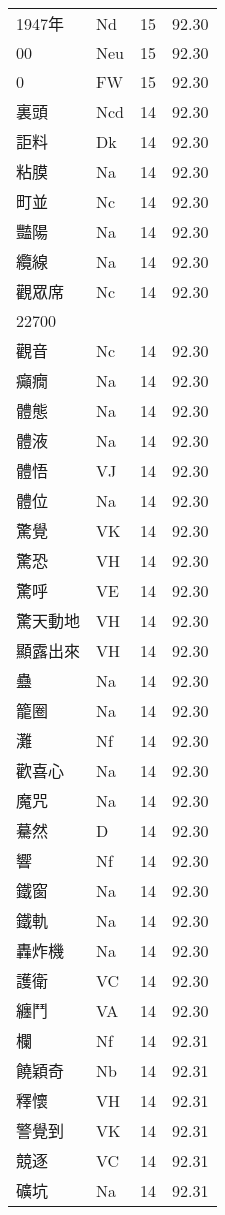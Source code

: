 \documentclass[twocolumn]{book}
\begin{document}
\begin{supertabular}{llrr}
1947年 & Nd & 15 &  92.30\\
00 & Neu & 15 &  92.30\\
0 & FW & 15 &  92.30\\
裏頭 & Ncd & 14 &  92.30\\
詎料 & Dk & 14 &  92.30\\
粘膜 & Na & 14 &  92.30\\
町並 & Nc & 14 &  92.30\\
豔陽 & Na & 14 &  92.30\\
纜線 & Na & 14 &  92.30\\
觀眾席 & Nc & 14 &  92.30\\
22700\\
觀音 & Nc & 14 &  92.30\\
癲癇 & Na & 14 &  92.30\\
體態 & Na & 14 &  92.30\\
體液 & Na & 14 &  92.30\\
體悟 & VJ & 14 &  92.30\\
體位 & Na & 14 &  92.30\\
驚覺 & VK & 14 &  92.30\\
驚恐 & VH & 14 &  92.30\\
驚呼 & VE & 14 &  92.30\\
驚天動地 & VH & 14 &  92.30\\
顯露出來 & VH & 14 &  92.30\\
蠱 & Na & 14 &  92.30\\
籠圈 & Na & 14 &  92.30\\
灘 & Nf & 14 &  92.30\\
歡喜心 & Na & 14 &  92.30\\
魔咒 & Na & 14 &  92.30\\
驀然 & D & 14 &  92.30\\
響 & Nf & 14 &  92.30\\
鐵窗 & Na & 14 &  92.30\\
鐵軌 & Na & 14 &  92.30\\
轟炸機 & Na & 14 &  92.30\\
護衛 & VC & 14 &  92.30\\
纏鬥 & VA & 14 &  92.30\\
欄 & Nf & 14 &  92.31\\
饒穎奇 & Nb & 14 &  92.31\\
釋懷 & VH & 14 &  92.31\\
警覺到 & VK & 14 &  92.31\\
競逐 & VC & 14 &  92.31\\
礦坑 & Na & 14 &  92.31\\

\end{supertabular}
\end{document}
